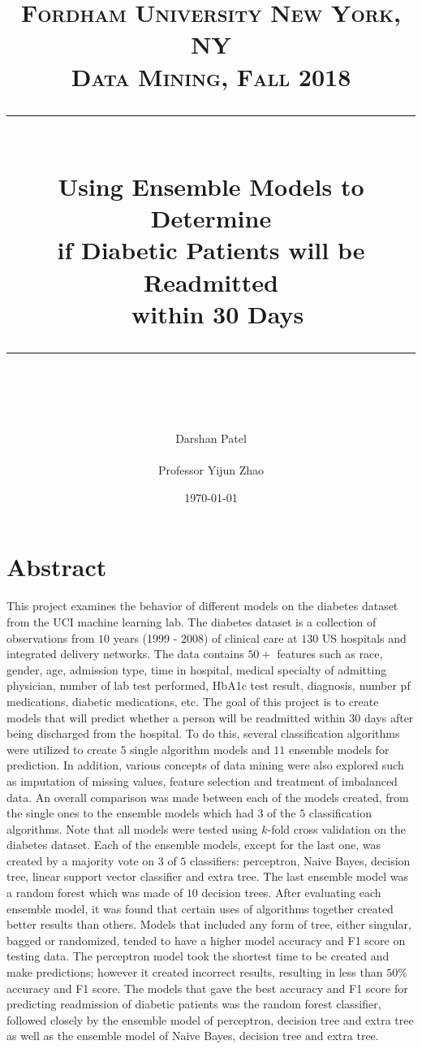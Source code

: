 \documentclass{article}
\title{
\normalfont \normalsize 
\textsc{Fordham University New York, NY \\ 
Data Mining, Fall 2018} \\
[10pt] 
\rule{\linewidth}{0.35pt} \\[12pt] 
\LARGE Using Ensemble Models to Determine \\ if Diabetic Patients will be Readmitted \\\ within 30 Days \\ 
\rule{\linewidth}{2pt}  \\[10pt]
}
\author{Darshan Patel \\~\\ Professor Yijun Zhao}
\date{\normalsize \today}
\begin{document}
\maketitle
\noindent
\tableofcontents


\section{Abstract}
This project examines the behavior of different models on the diabetes dataset from the UCI machine learning lab. The diabetes dataset is a collection of observations from $10$  years (1999 - 2008) of clinical care at $130$ US hospitals and integrated delivery networks. The data contains $50+$ features such as race, gender, age, admission type, time in hospital, medical specialty of admitting physician, number of lab test performed, HbA1c test result, diagnosis, number pf medications, diabetic medications, etc. The goal of this project is to create models that will predict whether a person will be readmitted within $30$ days after being discharged from the hospital. To do this, several classification algorithms were utilized to create $5$ single algorithm models and $11$ ensemble models for prediction. In addition, various concepts of data mining were also explored such as imputation of missing values, feature selection and treatment of imbalanced data. An overall comparison was made between each of the models created, from the single ones to the ensemble models which had $3$ of the $5$ classification algorithms. Note that all models were tested using $k$-fold cross validation on the diabetes dataset. Each of the ensemble models, except for the last one, was created by a majority vote on $3$ of $5$ classifiers: perceptron, Naive Bayes, decision tree, linear support vector classifier and extra tree. The last ensemble model was a random forest which was made of $10$ decision trees. After evaluating each ensemble model, it was found that certain uses of algorithms together created better results than others. Models that included any form of tree, either singular, bagged or randomized, tended to have a higher model accuracy and F1 score on testing data. The perceptron model took the shortest time to be created and make predictions; however it created incorrect results, resulting in less than $50\%$ accuracy and F1 score. The models that gave the best accuracy and F1 score for predicting readmission of diabetic patients was the random forest classifier, followed closely by the ensemble model of perceptron, decision tree and extra tree as well as the ensemble model of Naive Bayes, decision tree and extra tree. 
\newpage
\end{document}
